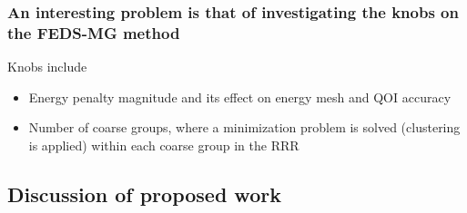 \documentclass[compress,10pt]{beamer}
\begin{document}
\begin{frame}
    \frametitle{An interesting problem is that of investigating the knobs on the FEDS-MG method}

    \centering

    \begin{block}{Knobs include}
        \begin{itemize}
            \item Energy penalty magnitude and its effect on energy mesh and QOI accuracy
            \item Number of coarse groups, where a minimization problem is solved (clustering is applied) within each coarse group in the RRR
        \end{itemize}
    \end{block}

\end{frame}

\subsection{Discussion of proposed work}

\typeout{***********************************************************************************}
\end{document}
